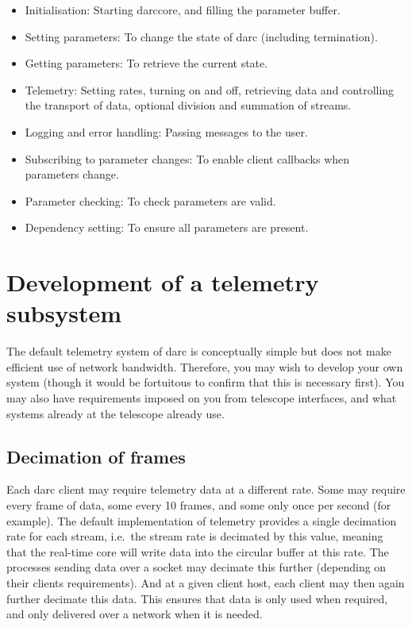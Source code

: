 \documentclass[a4,10pt]{article}
\begin{document}
\begin{itemize}
\item Initialisation:  Starting darccore, and filling the parameter
  buffer.
\item Setting parameters:  To change the state of darc (including termination).
\item Getting parameters:  To retrieve the current state.
\item Telemetry:  Setting rates, turning on and off, retrieving
  data and controlling the transport of data, optional division and
  summation of streams.
\item Logging and error handling: Passing messages to the user.
\item Subscribing to parameter changes: To enable client callbacks
  when parameters change.
\item Parameter checking:  To check parameters are valid.
\item Dependency setting:  To ensure all parameters are present.
\end{itemize}

\section{Development of a telemetry subsystem}
The default telemetry system of darc is conceptually simple but does
not make efficient use of network bandwidth.  Therefore, you may wish
to develop your own system (though it would be fortuitous to confirm
that this is necessary first).  You may also have requirements imposed
on you from telescope interfaces, and what systems already at the
telescope already use.  


\subsection{Decimation of frames}
Each darc client may require telemetry data at a different rate.  Some
may require every frame of data, some every 10 frames, and some only
once per second (for example).  The default implementation of
telemetry provides a single decimation rate for each stream, i.e.\ the
stream rate is decimated by this value, meaning that the real-time
core will write data into the circular buffer at this rate.  The
processes sending data over a socket may decimate this further
(depending on their clients requirements).  And at a given client host,
each client may then again further decimate this data.  This ensures
that data is only used when required, and only delivered over a
network when it is needed.
\end{document}
